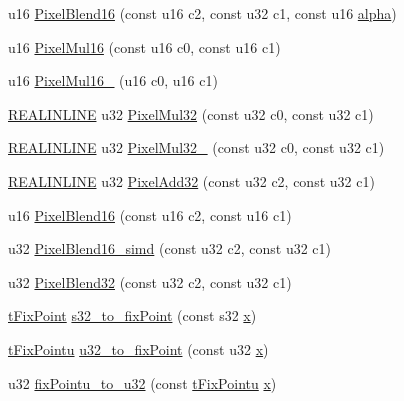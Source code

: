 \begin{DoxyCompactItemize}
\item 
u16 \hyperlink{namespaceirr_a7d68dae3725bdc1776723793e9967892}{Pixel\-Blend16} (const u16 c2, const u32 c1, const u16 \hyperlink{glext_8h_a55d98ec4b6aa35ace9b91275e7ad847b}{alpha})
\item 
u16 \hyperlink{namespaceirr_af787eebe45789ae72a40225bf234ea0a}{Pixel\-Mul16} (const u16 c0, const u16 c1)
\item 
u16 \hyperlink{namespaceirr_a08c63e47cf02ea3bb9624aa5b4ca0fba}{Pixel\-Mul16\-\_} (u16 c0, u16 c1)
\item 
\hyperlink{_software_driver2__compile__config_8h_a3695e51e0a187a6c49684ba3206b0d0a}{R\-E\-A\-L\-I\-N\-L\-I\-N\-E} u32 \hyperlink{namespaceirr_a9f0e4eeb9470c5d83e0d9599a6031264}{Pixel\-Mul32} (const u32 c0, const u32 c1)
\item 
\hyperlink{_software_driver2__compile__config_8h_a3695e51e0a187a6c49684ba3206b0d0a}{R\-E\-A\-L\-I\-N\-L\-I\-N\-E} u32 \hyperlink{namespaceirr_ad3301e8dd2da82f115d8f610c97d84f0}{Pixel\-Mul32\-\_} (const u32 c0, const u32 c1)
\item 
\hyperlink{_software_driver2__compile__config_8h_a3695e51e0a187a6c49684ba3206b0d0a}{R\-E\-A\-L\-I\-N\-L\-I\-N\-E} u32 \hyperlink{namespaceirr_a2017c88e68bc997fd86106fbda9fea4e}{Pixel\-Add32} (const u32 c2, const u32 c1)
\item 
u16 \hyperlink{namespaceirr_a8e4c2285b836cae10bd134680a90a53b}{Pixel\-Blend16} (const u16 c2, const u16 c1)
\item 
u32 \hyperlink{namespaceirr_aff15ad94ca4a5eadb9699461ffb18fb1}{Pixel\-Blend16\-\_\-simd} (const u32 c2, const u32 c1)
\item 
u32 \hyperlink{namespaceirr_a3bb3a374d15ae98bf3c111a499b44ed0}{Pixel\-Blend32} (const u32 c2, const u32 c1)
\item 
\hyperlink{namespaceirr_a705cfbd95ac6f0e531f1b341af6fae39}{t\-Fix\-Point} \hyperlink{namespaceirr_a1b94060a7c7858b742f07c5d71aa884c}{s32\-\_\-to\-\_\-fix\-Point} (const s32 \hyperlink{glext_8h_ad77deca22f617d3f0e0eb786445689fc}{x})
\item 
\hyperlink{namespaceirr_abd8e4c96433c2eecb4b48987f9cd7859}{t\-Fix\-Pointu} \hyperlink{namespaceirr_ae62164bbde615f6a775166982fe4e164}{u32\-\_\-to\-\_\-fix\-Point} (const u32 \hyperlink{glext_8h_ad77deca22f617d3f0e0eb786445689fc}{x})
\item 
u32 \hyperlink{namespaceirr_a01779509f8e399e091b1323529d98264}{fix\-Pointu\-\_\-to\-\_\-u32} (const \hyperlink{namespaceirr_abd8e4c96433c2eecb4b48987f9cd7859}{t\-Fix\-Pointu} \hyperlink{glext_8h_ad77deca22f617d3f0e0eb786445689fc}{x})

\end{DoxyCompactItemize}
